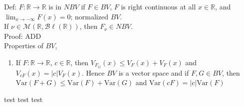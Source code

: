 \documentclass[12pt]{article}
\newcommand{\reals}[0] { \mathbb{R}}
\newcommand{\M}[0] { \mathcal{M} }
\newcommand{\Bl}[0] { \mathcal{B} \ell }
\newcommand{\rarw}[0] { \rightarrow }
\newcommand{ \Var } { \textrm{Var} }
\begin{document}
Def: $F: \reals \rarw \reals$ is in $NBV$ if $F \in BV$, $F$ is right continuous at all $x \in \reals$, and $\lim_{x \rarw -\infty} F(x) = 0$; normalized $BV$.\\

If $\nu \in \M(\reals, \Bl(\reals))$, then $F_\nu \in NBV$. \\

\noindent
Proof: ADD \\

Properties of $BV$,

\begin{enumerate}
\item
If $F: \reals \rarw \reals$, $c \in \reals$, then $V_{F_G}(x) \le V_F(x) + V_F(x)$ and $V_{cF}(x) = |c| V_F(x)$. Hence $BV$ is a vector space and if $F,G \in BV$, then $\Var(F+G) \le \Var(F) + \Var(G)$ and $\Var(cF) = |c| \Var(F)$
\end{enumerate}



test test test

	
\end{document}
